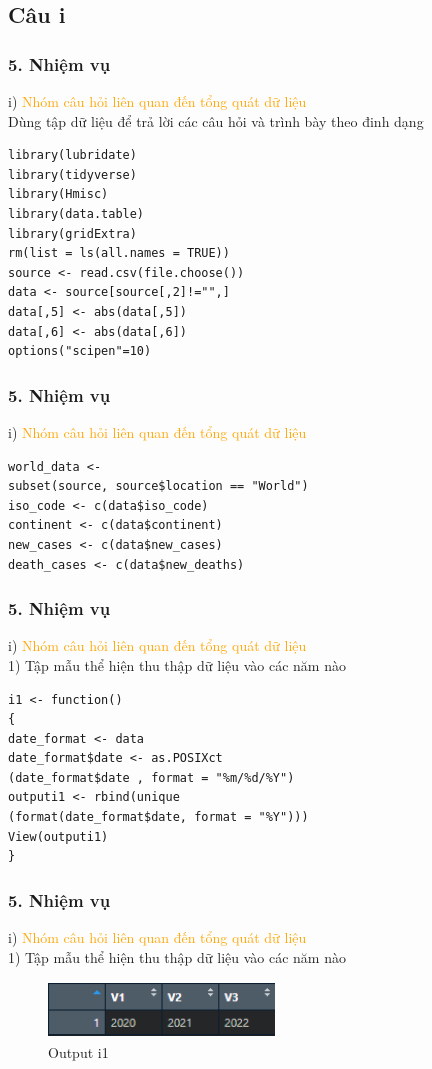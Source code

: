\documentclass[english,10pt,table]{beamer}
\begin{document}
\subsection{Câu i}
\begin{frame}[fragile]
\frametitle{5.  Nhiệm vụ}
	i) \textcolor{orange}{Nhóm câu hỏi liên quan đến tổng quát dữ liệu}\\
	Dùng tập dữ liệu để trả lời các câu hỏi và trình bày theo đinh dạng
\begin{lstlisting}[frame=single]
library(lubridate)
library(tidyverse)
library(Hmisc)
library(data.table)
library(gridExtra)
rm(list = ls(all.names = TRUE))
source <- read.csv(file.choose())
data <- source[source[,2]!="",]
data[,5] <- abs(data[,5])
data[,6] <- abs(data[,6])
options("scipen"=10)
	\end{lstlisting}
\end{frame}

\begin{frame}[fragile]
\frametitle{5.  Nhiệm vụ}
	i) \textcolor{orange}{Nhóm câu hỏi liên quan đến tổng quát dữ liệu}\\
\begin{lstlisting}[frame=single]
world_data <- 
subset(source, source$location == "World")
iso_code <- c(data$iso_code)
continent <- c(data$continent)
new_cases <- c(data$new_cases)
death_cases <- c(data$new_deaths)
	\end{lstlisting}
\end{frame}

\begin{frame}[fragile]
\frametitle{5.  Nhiệm vụ}
	i) \textcolor{orange}{Nhóm câu hỏi liên quan đến tổng quát dữ liệu}\\
	1) Tập mẫu thể hiện thu thập dữ liệu vào các năm nào
		\begin{lstlisting}[frame=single]  
i1 <- function()
{
date_format <- data
date_format$date <- as.POSIXct
(date_format$date , format = "%m/%d/%Y")
outputi1 <- rbind(unique
(format(date_format$date, format = "%Y")))
View(outputi1)
}
		\end{lstlisting}
\end{frame}

\begin{frame}[fragile]
\frametitle{5.  Nhiệm vụ}
	i) \textcolor{orange}{Nhóm câu hỏi liên quan đến tổng quát dữ liệu}\\
	1) Tập mẫu thể hiện thu thập dữ liệu vào các năm nào\\
	\begin{figure}[h!]
	\begin{center}
		    \includegraphics[width=6cm,height=1.5cm]{Images/I/I1.png}
		            \caption{Output i1}

		\end{center}
		\end{figure}
\end{frame}
\end{document}
